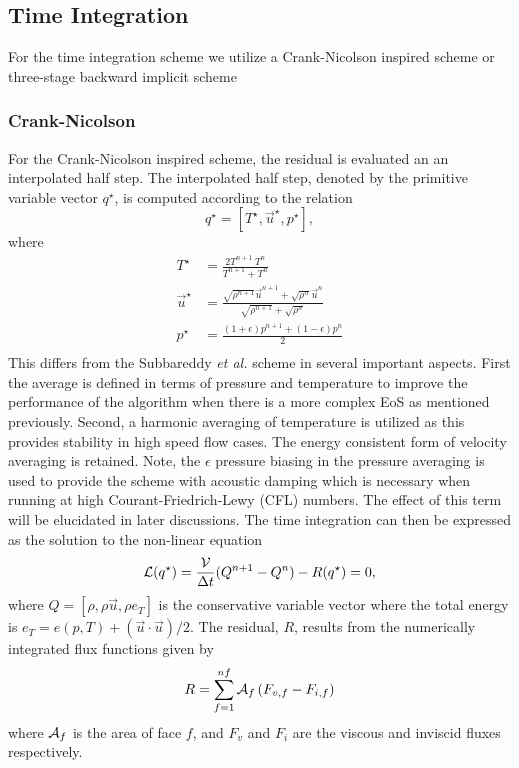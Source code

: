 \subsection{Time Integration}

For the time integration scheme we utilize a Crank-Nicolson inspired
scheme or three-stage backward implicit scheme

\subsubsection{Crank-Nicolson}
For the Crank-Nicolson inspired
scheme, the residual is evaluated an an interpolated half step.
The interpolated half step, denoted by the primitive variable vector
$q^{\star}$, is computed according to the relation
\begin{equation}
  q^{\star} = \left[ T^{\star}, \vec{u}^{\star}, p^{\star} \right ],
\label{half_step}
\end{equation}
where 
\begin{equation}
\begin{aligned}
  T^{\star} &= \frac{2 T^{n+1} ~ T^{n}}{T^{n+1} + T^{n}} \\
  \vec{u}^{\star} &= \frac{\sqrt{\rho^{n+1}} \vec{u}^{n+1}+\sqrt{\rho^{n}} \vec{u}^n} {\sqrt{\rho^{n+1}}+\sqrt{\rho^n}} \\
p^{\star} &= \frac{(1+\epsilon)p^{n+1} + (1-\epsilon)p^{n}}{2}\\
\label{eq:temporalavg}
\end{aligned}
\end{equation} 
This differs from the Subbareddy {\it et al.} \cite{Subbareddy.2009}
scheme in several important aspects.  First the average is defined in
terms of pressure and temperature to improve the performance
of the algorithm when there is a more complex EoS as mentioned
previously.  Second, a harmonic averaging of temperature is utilized
as this provides stability in high speed flow cases.  The energy
consistent form of velocity averaging is retained.  Note, the
$\epsilon$ pressure biasing in the pressure averaging is used to
provide the scheme with acoustic damping which is necessary when
running at high Courant-Friedrich-Lewy (CFL) numbers.  The effect of
this term will be elucidated in later discussions.  The time
integration can then be expressed as the solution to the non-linear
equation
\begin{equation}
\mathcal{L}(q^{\star})=\frac{\mathcal{V}}{\Delta t} (Q^{n+1} - Q^n) - R(q^{\star}) = 0 ,
\label{Lcn}
\end{equation}
where $Q = \left[ \rho, \rho\vec{u}, \rho e_T \right]$ is the
conservative variable vector where the total energy is $e_T =
e(p,T)+(\vec{u}\cdot \vec{u})/2$.  The residual, $R$, results from the
numerically integrated flux functions given by
\begin{equation}
R = \sum_{f=1}^{nf} \mathcal{A}_f \left( F_{v,f} - F_{i,f} \right)
\label{resid}
\end{equation}
where $\mathcal{A}_f$ is the area of face $f$, and $F_v$ and $F_i$ are the
viscous and inviscid fluxes respectively.

